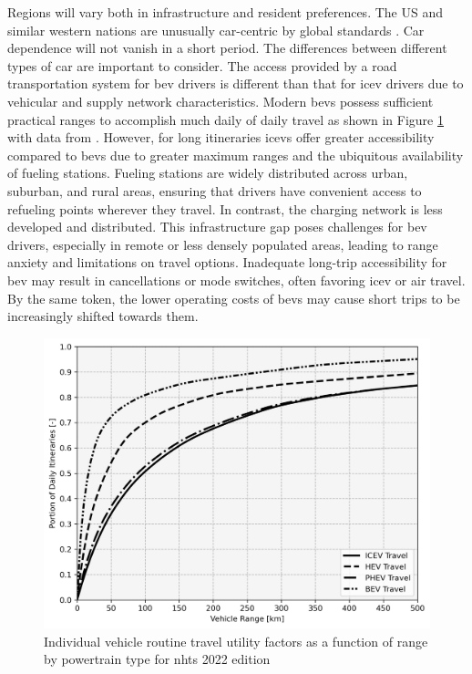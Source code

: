 Regions will vary both in infrastructure and resident preferences. The US and similar western nations are unusually car-centric by global standards  \cite{PrietoCuriel_2024}. Car dependence will not vanish in a short period. The differences between different types of car are important to consider. The access provided by a road transportation system for \gls{bev} drivers is different than that for \gls{icev} drivers due to vehicular and supply network characteristics. Modern \glspl{bev} possess sufficient practical ranges to accomplish much daily of daily travel as shown in Figure \ref{fig:utility_factors} with data from \cite{NHTS_2017, NHTS_2022}. However, for long itineraries \glspl{icev} offer greater accessibility compared to \glspl{bev} due to greater maximum ranges and the ubiquitous availability of fueling stations. Fueling stations are widely distributed across urban, suburban, and rural areas, ensuring that drivers have convenient access to refueling points wherever they travel. In contrast, the  charging network is less developed and distributed. This infrastructure gap poses challenges for \gls{bev} drivers, especially in remote or less densely populated areas, leading to range anxiety and limitations on travel options. Inadequate long-trip accessibility for \gls{bev} may result in cancellations or mode switches, often favoring \gls{icev} or air travel. By the same token, the lower operating costs of \glspl{bev} may cause short trips to be increasingly shifted towards them.

\begin{figure}[H]
	\centering
	\includegraphics[width = \linewidth]{figs/UF_2022_km.png}
	\caption{Individual vehicle routine travel utility factors as a function of range by powertrain type for \gls{nhts} 2022 edition}
	\label{fig:utility_factors}
\end{figure}

